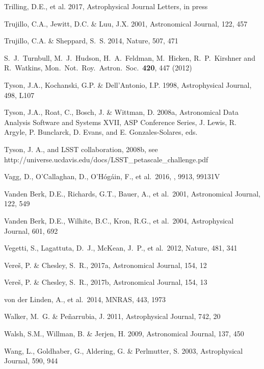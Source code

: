 \documentclass[twocolumn]{aastex61}
\begin{document}
\begin{thebibliography}{}
\bibitem[()]{} Trilling, D.E., et al.  2017, Astrophysical Journal Letters, in press

\bibitem[()]{} Trujillo, C.A., Jewitt, D.C. \& Luu, J.X. 2001, Astronomical Journal, 122, 457

\bibitem[()]{} Trujillo, C.A. \& Sheppard, S.~S. 2014, Nature, 507, 471

\bibitem[()]{} S.~J.~Turnbull, M.~J.~Hudson, H.~A.~Feldman, M.~Hicken, R.~P.~Kirshner and R.~Watkins, Mon.\ Not.\ Roy.\ Astron.\ Soc.\  {\bf 420}, 447 (2012)

\bibitem[()]{} Tyson, J.A., Kochanski, G.P. \& Dell'Antonio, I.P. 1998, Astrophysical Journal, 498, L107

\bibitem[()]{} Tyson, J.A., Roat, C., Bosch, J. \& Wittman, D. 2008a, Astronomical
             Data Analysis Software and Systems XVII, ASP Conference Series,
             J. Lewis, R. Argyle, P. Bunclarck, D. Evans, and E. Gonzales-Solares, eds.

\bibitem[()]{} Tyson, J. A., and LSST collaboration, 2008b, see
                 http://universe.ucdavis.edu/docs/LSST\_petascale\_challenge.pdf

 Vagg, D., O'Callaghan, D., O'H{\'o}g{\'a}in, F., et al.\ 2016, \procspie, 9913, 99131V

\bibitem[()]{} Vanden Berk, D.E., Richards, G.T., Bauer, A., et al.~2001, Astronomical Journal, 122, 549

\bibitem[()]{} Vanden Berk, D.E., Wilhite, B.C., Kron, R.G., et al.~2004, Astrophysical Journal, 601, 692

\bibitem[()]{} Vegetti, S., Lagattuta, D.~J., McKean, J.~P., et al.\ 2012, Nature, 481, 341

\bibitem[()]{} Vere{\v s}, P. \& Chesley, S.~R., 2017a, Astronomical Journal, 154, 12

\bibitem[()]{} Vere{\v s}, P. \& Chesley, S.~R., 2017b, Astronomical Journal, 154, 13

\bibitem[()]{} von der Linden, A., et al.~2014, MNRAS, 443, 1973

\bibitem[()]{} Walker, M.~G. \& Pe{\~n}arrubia, J. 2011, Astrophysical Journal, 742, 20


\bibitem[()]{} Walsh, S.M., Willman, B. \& Jerjen, H. 2009, Astronomical Journal, 137, 450

\bibitem[()]{} Wang, L., Goldhaber, G., Aldering, G. \& Perlmutter, S. 2003, Astrophysical Journal, 590, 944


\end{thebibliography}
\end{document}
